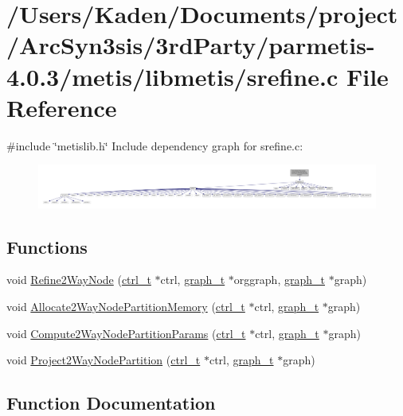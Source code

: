 \hypertarget{a00278}{}\section{/\+Users/\+Kaden/\+Documents/project/\+Arc\+Syn3sis/3rd\+Party/parmetis-\/4.0.3/metis/libmetis/srefine.c File Reference}
\label{a00278}
{\ttfamily \#include \char`\"{}metislib.\+h\char`\"{}}\newline
Include dependency graph for srefine.\+c\+:\nopagebreak
\begin{figure}[H]
\begin{center}
\leavevmode
\includegraphics[width=350pt]{a00279}
\end{center}
\end{figure}
\subsection*{Functions}
\begin{DoxyCompactItemize}
\item 
void \hyperlink{a00278_a2fd4bd5f789c1c1248aa326d0cac9023}{Refine2\+Way\+Node} (\hyperlink{a00742}{ctrl\+\_\+t} $\ast$ctrl, \hyperlink{a00734}{graph\+\_\+t} $\ast$orggraph, \hyperlink{a00734}{graph\+\_\+t} $\ast$graph)
\item 
void \hyperlink{a00278_a843a5692564dc695b281647dc690c887}{Allocate2\+Way\+Node\+Partition\+Memory} (\hyperlink{a00742}{ctrl\+\_\+t} $\ast$ctrl, \hyperlink{a00734}{graph\+\_\+t} $\ast$graph)
\item 
void \hyperlink{a00278_a66257f7c528ad75c86244ef3794d1ae5}{Compute2\+Way\+Node\+Partition\+Params} (\hyperlink{a00742}{ctrl\+\_\+t} $\ast$ctrl, \hyperlink{a00734}{graph\+\_\+t} $\ast$graph)
\item 
void \hyperlink{a00278_ab3d791e7adffa770602e257ecdaabd72}{Project2\+Way\+Node\+Partition} (\hyperlink{a00742}{ctrl\+\_\+t} $\ast$ctrl, \hyperlink{a00734}{graph\+\_\+t} $\ast$graph)
\end{DoxyCompactItemize}


\subsection{Function Documentation}
\mbox{\label{a00278_a843a5692564dc695b281647dc690c887}} 
